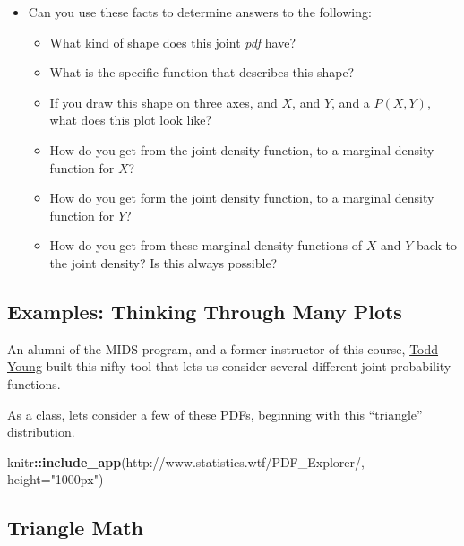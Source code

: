 \documentclass[
]{book}
\newenvironment{Shaded}{\begin{snugshade}}{\end{snugshade}}
\newcommand{\AttributeTok}[1]{\textcolor[rgb]{0.13,0.29,0.53}{#1}}
\newcommand{\FunctionTok}[1]{\textcolor[rgb]{0.13,0.29,0.53}{\textbf{#1}}}
\newcommand{\NormalTok}[1]{#1}
\newcommand{\SpecialCharTok}[1]{\textcolor[rgb]{0.81,0.36,0.00}{\textbf{#1}}}
\newcommand{\StringTok}[1]{\textcolor[rgb]{0.31,0.60,0.02}{#1}}
\providecommand{\tightlist}{%
  \setlength{\itemsep}{0pt}\setlength{\parskip}{0pt}}
\theoremstyle{definition}
\theoremstyle{definition}
\theoremstyle{definition}
\theoremstyle{definition}
\theoremstyle{remark}
\begin{document}
\begin{itemize}
\tightlist
\item
  Can you use these facts to determine answers to the following:

  \begin{itemize}
  \tightlist
  \item
    What kind of shape does this joint \emph{pdf} have?
  \item
    What is the specific function that describes this shape?
  \item
    If you draw this shape on three axes, and \(X\), and \(Y\), and a \(P(X,Y)\), what does this plot look like?
  \item
    How do you get from the joint density function, to a marginal density function for \(X\)?
  \item
    How do you get form the joint density function, to a marginal density function for \(Y\)?
  \item
    How do you get from these marginal density functions of \(X\) and \(Y\) back to the joint density? Is this always possible?
  \end{itemize}
\end{itemize}

\hypertarget{examples-thinking-through-many-plots}{%
\subsection{Examples: Thinking Through Many Plots}\label{examples-thinking-through-many-plots}}

An alumni of the MIDS program, and a former instructor of this course, \href{https://www.linkedin.com/in/dtoddyoung/}{Todd Young} built this nifty tool that lets us consider several different joint probability functions.

As a class, lets consider a few of these PDFs, beginning with this ``triangle'' distribution.

\begin{Shaded}
\begin{Highlighting}[]
\NormalTok{knitr}\SpecialCharTok{::}\FunctionTok{include\_app}\NormalTok{(}\StringTok{\textquotesingle{}http://www.statistics.wtf/PDF\_Explorer/\textquotesingle{}}\NormalTok{, }\AttributeTok{height=}\StringTok{"1000px"}\NormalTok{)}
\end{Highlighting}
\end{Shaded}

\hypertarget{triangle-math}{%
\subsection{Triangle Math}\label{triangle-math}}
\end{document}
